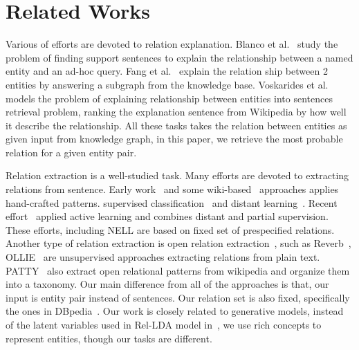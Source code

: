\section{Related Works}
\label{sec:rel}

Various of efforts are devoted to relation explanation.
Blanco et al.~\cite{blanco2010finding} study the problem of finding support sentences to explain the relationship between a named entity and an ad-hoc query.
Fang et al.~\cite{fang2011rex} explain the relation ship between 2 entities by answering a subgraph from the knowledge base.
Voskarides et al.~\cite{voskarideslearning} models the problem of explaining relationship between entities into sentences retrieval problem, ranking the explanation sentence from Wikipedia by how well it describe the relationship.
All these tasks takes the relation between entities as given input from knowledge graph, in this paper, we retrieve the most probable relation for a given entity pair.

Relation extraction is a well-studied task.
Many efforts are devoted to extracting relations from sentence.
Early work~\cite{hearst1992automatic,brin1999extracting,agichtein2000snowball} and some wiki-based~\cite{ponzetto2008wikitaxonomy} approaches applies hand-crafted patterns.
supervised classification~\cite{doddington2004automatic,guodong2005exploring} and distant learning~\cite{craven1999constructing,wu2007autonomously,bunescu2007learning,mintz2009distant}.
Recent effort~\cite{angeli2014combining} applied active learning and combines distant and partial supervision.
These efforts, including NELL are based on  fixed set of prespecified relations.
Another type of relation extraction is open relation extraction~\cite{banko2007open}, such as Reverb~\cite{fader2011identifying}, OLLIE~\cite{schmitz2012open} are unsupervised approaches extracting relations from plain text.
PATTY~\cite{nakashole2012patty} also extract open relational patterns from wikipedia and organize them into a taxonomy.
Our main difference from all of the approaches is that, our input is entity pair instead of sentences.
Our relation set is also fixed, specifically the ones in DBpedia~\cite{auer2007dbpedia}.
Our work is closely related to generative models, instead of the latent variables used in Rel-LDA model in~\cite{yao2011structured}, we use rich concepts to represent entities, though our tasks are different.



